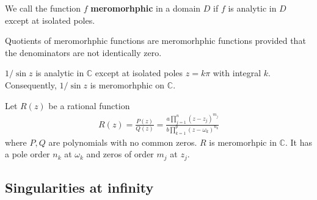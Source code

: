 \begin{definition}
    We call the function $f$ \textbf{meromorhphic} in a domain $D$ if $f$ is analytic in $D$ except at isolated poles.
\end{definition}

\begin{remark}
    Quotients of meromorhphic functions are meromorhphic functions provided that the denominators are not identically zero.
\end{remark}

\begin{ex}
    $1/\sin z$ is analytic in $\mathbb{C}$ except at isolated poles $z=k\pi$ with integral $k$. Consequently, $1/\sin z$ is meromorhphic on $\mathbb{C}$.
\end{ex}

\begin{ex}
    Let $R(z)$ be a rational function
    \begin{align*}
        R(z)=\frac{P(z)}{Q(z)}=\frac{a\prod_{j=1}^n (z-z_j)^{m_j}}{b\prod_{k=1}^p(z-\omega_k)^{n_k}}
    \end{align*}
    where $P, Q$ are polynomials with no common zeros. $R$ is meromorhpic in $\mathbb{C}$. It has a pole order $n_k$ at $\omega_k$ and zeros of order
    $m_j$ at $z_j$.
\end{ex}

\subsection{Singularities at infinity}

